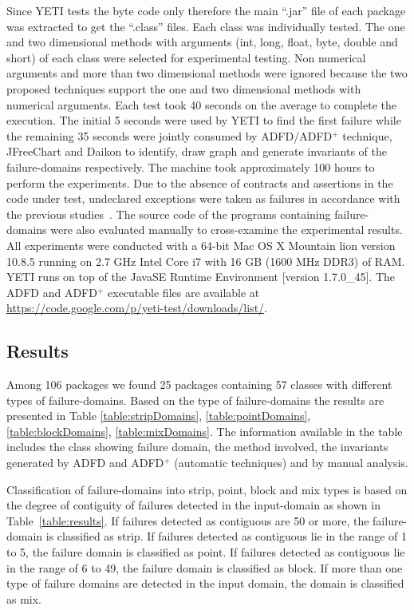 Since YETI tests the byte code only therefore the main ``.jar'' file of each package was extracted to get the ``.class'' files. Each class was individually tested. The one and two dimensional methods with arguments (int, long, float, byte, double and short) of each class were selected for experimental testing. Non numerical arguments and more than two dimensional methods were ignored because the two proposed techniques support the one and two dimensional methods with numerical arguments. Each test took 40 seconds on the average to complete the execution. The initial 5 seconds were used by YETI to find the first failure while the remaining 35 seconds were jointly consumed by ADFD/ADFD$^+$ technique, JFreeChart and Daikon to identify, draw graph and generate invariants of the failure-domains respectively. The machine took approximately 100 hours to perform the experiments. Due to the absence of contracts and assertions in the code under test, undeclared exceptions were taken as failures in accordance with the previous studies~\cite{oriol2012random, ahmad2013adfd}. The source code of the programs containing failure-domains were also evaluated manually to cross-examine the experimental results. All experiments were conducted with a 64-bit Mac OS X Mountain lion version 10.8.5 running on 2.7 GHz Intel Core i7 with 16 GB (1600 MHz DDR3) of RAM. YETI runs on top of the Java\texttrademark  SE Runtime Environment [version 1.7.0\_45]. The ADFD and ADFD$^+$ executable files are available at \url{https://code.google.com/p/yeti-test/downloads/list/}. 



\subsection{Results}
Among 106 packages we found 25 packages containing 57 classes with different types of failure-domains. Based on the type of failure-domains the results are presented in Table \ref{table:stripDomains}, \ref{table:pointDomains}, \ref{table:blockDomains}, \ref{table:mixDomains}. The information available in the table includes the class showing failure domain, the method involved, the invariants generated by ADFD and ADFD$^+$ (automatic techniques) and by manual analysis. 

Classification of failure-domains into strip, point, block and mix types is based on the degree of contiguity of failures detected in the input-domain as shown in Table~\ref{table:results}. If failures detected as contiguous are 50 or more, the failure-domain is classified as strip.  If failures detected as contiguous lie in the range of 1 to 5, the failure domain is classified as point. If failures detected as contiguous lie in the range of 6 to 49, the failure domain is classified as block. If more than one type of failure domains are detected in the input domain, the domain is classified as mix.
\bigskip

